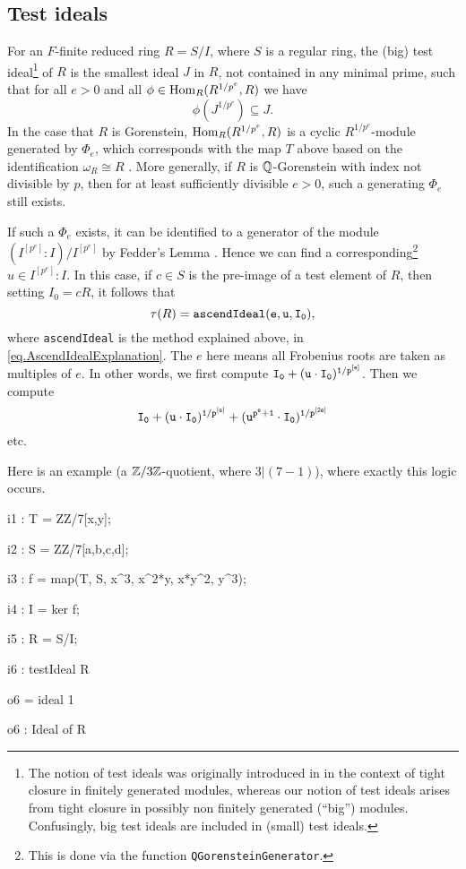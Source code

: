 \documentclass{amsart}
\begin{document}
\subsection{Test ideals}

For an $F$-finite reduced ring $R = S/I$, where $S$ is a regular ring, the (big) test ideal\footnote{The notion of test ideals was originally introduced in \cite{HochsterHunekeTC1} in the context of tight closure in finitely generated modules, whereas our notion of test ideals arises from
tight closure in possibly non finitely generated (``big'') modules. Confusingly, big test ideals are included in (small) test ideals.}
of $R$ is the smallest ideal $J$ in $R$, not contained in any minimal prime, such that for all $e > 0$ and all $\phi \in \operatorname{Hom}_R(R^{1/p^e}, R)$ we have
\[ \phi(J^{1/p^e}) \subseteq J.\]
In the case that $R$ is Gorenstein,
$\operatorname{Hom}_R(R^{1/p^e}, R)$ is a cyclic $R^{1/p^e}$-module generated by
$\Phi_e$, which corresponds with the map $T$ above based on the identification
$\omega_R \cong R$ \cite{BlickleSchwedeSurveyPMinusE}.  More generally, if $R$ is $\mathbb{Q}$-Gorenstein with index not divisible by $p$, then for at least sufficiently divisible $e > 0$, such a generating $\Phi_e$ still exists.

If such a $\Phi_e$ exists, it can be identified to a generator of the module $(I^{[p^e]} : I) / I^{[p^e]}$ by Fedder's Lemma \cite{FedderFPureRat}.  Hence we can find a corresponding\footnote{This is done via the function \texttt{QGorensteinGenerator}. } $u \in I^{[p^e]} : I$.  In this case, if $c \in S$ is the pre-image of a test element of $R$, then setting $I_0 = cR$, it follows that
\[
\tau(R) = {\tt ascendIdeal(e, u, I_0)},
\]
where \texttt{ascendIdeal} is the method explained above, in \autoref{eq.AscendIdealExplanation}.
The $e$ here means all Frobenius roots are taken as multiples of $e$.  In other words, we first compute ${\tt I_0 +  (u \cdot I_0)^{1/p^{[e]}}}$.  Then we compute
\[
{\tt I_0 +  (u\cdot I_0)^{1/p^{[e]}} + (u^{p^e + 1} \cdot I_0)^{1/p^{[2e]}} }
\]
etc.

Here is an example (a $\mathbb{Z}/3\mathbb{Z}$-quotient, where $3 | (7-1)$), where exactly this logic occurs.

\medskip
{\small{}
\begin{MyVerbatim}
i1 : T = ZZ/7[x,y];

i2 : S = ZZ/7[a,b,c,d];

i3 : f = map(T, S, {x^3, x^2*y, x*y^2, y^3});

i4 : I = ker f;

i5 : R = S/I;

i6 : testIdeal R

o6 = ideal 1

o6 : Ideal of R
\end{MyVerbatim}
}\medskip
\end{document}
